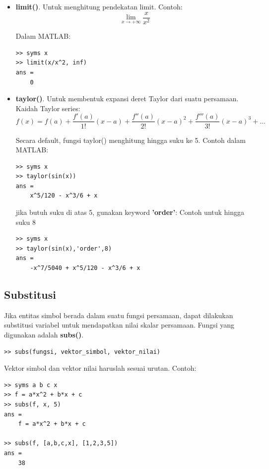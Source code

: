 \documentclass[12pt]{book}
\begin{document}
\begin{itemize}
		\item \textbf{limit()}. Untuk menghitung pendekatan limit.
		Contoh:
		\[\lim_{x \to +\infty} \frac{x}{x^2}\]
		
		Dalam MATLAB:
		\begin{verbatim}
>> syms x
>> limit(x/x^2, inf)
ans = 
    0
		\end{verbatim}
	
		\item \textbf{taylor()}. Untuk membentuk expansi deret Taylor dari suatu persamaan.
		Kaidah Taylor series:
		\[f(x) = f(a) + \frac{f'(a)}{1!}(x-a) + \frac{f''(a)}{2!}(x-a)^2 + \frac{f'''(a)}{3!}(x-a)^3 + ...\]
		
		Secara default, fungsi taylor() menghitung hingga suku ke 5.
		\newpage
		Contoh dalam MATLAB:
		\begin{verbatim}
>> syms x
>> taylor(sin(x))
ans = 
    x^5/120 - x^3/6 + x
		\end{verbatim}
	
		jika butuh suku di atas 5, gunakan keyword \textbf{'order'}:
		Contoh untuk hingga suku 8
		\begin{verbatim}
>> syms x
>> taylor(sin(x),'order',8)
ans = 
    -x^7/5040 + x^5/120 - x^3/6 + x
		\end{verbatim}
	
	\end{itemize} 
	
	\subsection{Substitusi}
	
	Jika entitas simbol berada dalam suatu fungsi persamaan, dapat dilakukan substitusi variabel untuk mendapatkan nilai skalar persamaan.
	Fungsi yang digunakan adalah \textbf{subs()}.
	\begin{verbatim}
>> subs(fungsi, vektor_simbol, vektor_nilai)
	\end{verbatim}

	Vektor simbol dan vektor nilai haruslah sesuai urutan.
	Contoh:
	\begin{verbatim}
>> syms a b c x
>> f = a*x^2 + b*x + c
>> subs(f, x, 5)
ans =
    f = a*x^2 + b*x + c
    
>> subs(f, [a,b,c,x], [1,2,3,5])
ans =
    38
	\end{verbatim}
	
\end{document}
